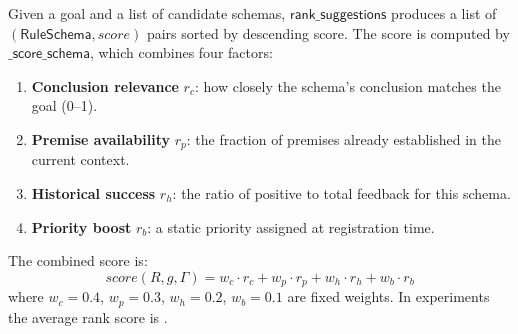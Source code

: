 \documentclass[11pt]{article}
\newcommand{\RS}{\ensuremath{\mathsf{RuleSchema}}}
\newcommand{\rankSugg}{\ensuremath{\mathsf{rank\_suggestions}}}
\newcommand{\scoreSchema}{\ensuremath{\mathsf{\_score\_schema}}}
\begin{document}
Given a goal and a list of candidate schemas, $\rankSugg$ produces
a list of $(\RS, \mathit{score})$ pairs sorted by descending
score.  The score is computed by $\scoreSchema$, which combines
four factors:

\begin{enumerate}
  \item \textbf{Conclusion relevance} $r_c$: how closely the
    schema's conclusion matches the goal (0--1).
  \item \textbf{Premise availability} $r_p$: the fraction of
    premises already established in the current context.
  \item \textbf{Historical success} $r_h$: the ratio of positive
    to total feedback for this schema.
  \item \textbf{Priority boost} $r_b$: a static priority assigned
    at registration time.
\end{enumerate}

\noindent
The combined score is:
\begin{equation}\label{eq:score}
  \mathit{score}(R, g, \Gamma) =
    w_c \cdot r_c + w_p \cdot r_p + w_h \cdot r_h + w_b \cdot r_b
\end{equation}
where $w_c = 0.4$, $w_p = 0.3$, $w_h = 0.2$, $w_b = 0.1$ are
fixed weights.  In experiments the average rank score is
\ppLXXXVIIavgRankScore{}.
\end{document}
